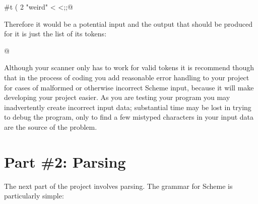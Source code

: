 \documentclass[11pt]{article}
\begin{document}
    \vspace{-2mm}

    \begin{center}

      \verb@#t ( 2 "weird" < <;;@

    \end{center}

    \vspace{-2mm}

    Therefore it would be a potential input and the output that should be
  produced for it is just the list of its tokens:

    \vspace{-5mm}

    \begin{center}

      \verb@[#t; (; 2; "weird"; <; <]@

    \end{center}

    \vspace{-1mm}

    Although your scanner only has to work for valid tokens it is recommend
  though that in the process of coding you add reasonable error handling to
  your project for cases of malformed or otherwise incorrect Scheme input,
  because it will make developing your project easier.  As you are testing
  your program you may inadvertently create incorrect input data;
  substantial time may be lost in trying to debug the program, only to find
  a few mistyped characters in your input data are the source of the
  problem.

  \section{Part \#2: Parsing}

    The next part of the project involves parsing.  The grammar for Scheme is
  particularly simple:

    \vspace{-2.5mm}
\end{document}
